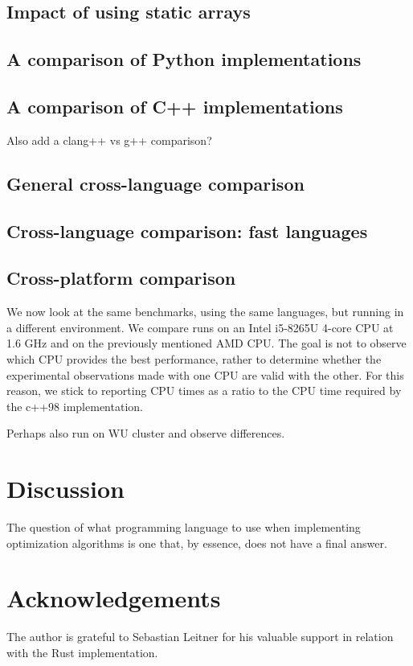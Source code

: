 \documentclass[11pt,a4paper,notitlepage]{article}
\begin{document}
\subsection{Impact of using static arrays}
\subsection{A comparison of Python implementations}
\subsection{A comparison of C++ implementations}
Also add a clang++ vs g++ comparison?
\subsection{General cross-language comparison}
\subsection{Cross-language comparison: fast languages}

\subsection{Cross-platform comparison}
We now look at the same benchmarks, using the same languages, but running
in a different environment. We compare runs on an Intel i5-8265U
4-core CPU at 1.6 GHz and on the previously mentioned AMD CPU. The
goal is not to observe which CPU provides the best performance, rather
to determine whether the experimental observations made with one CPU
are valid with the other. For this reason, we stick to reporting CPU
times as a ratio to the CPU time required by the c++98 implementation.

Perhaps also run on WU cluster and observe differences.

\section{Discussion}
The question of what programming language to use when implementing
optimization algorithms is one that, by essence, does not have a final
answer.

\section*{Acknowledgements}
The author is grateful to Sebastian Leitner for his valuable support
in relation with the Rust implementation.
\end{document}
